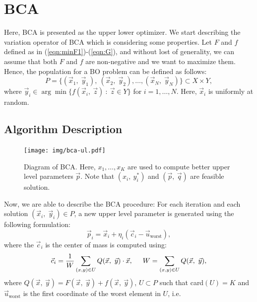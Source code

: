 \documentclass[conference]{IEEEtran}
\begin{document}
\section{BCA} %
\label{sec:bca}

Here, BCA is presented as the upper lower optimizer. We start describing the
variation operator of BCA which is considering some properties. Let $F$ and $f$
defined as in (\ref{eqn:minF1})-(\ref{eqn:G}), and without lost of generality, we
can assume that both $F$ and $f$ are non-negative and we want to maximize them.
Hence, the population for a BO problem can be defined as follows: 
$$
    P = \{ (\vec{x}_1,\; \vec{y}_1), \ (\vec{x}_2,\; \vec{y}_2), \ldots,
           (\vec{x}_N,\; \vec{y}_N)
         \}
         \subset X \times Y,
$$
where $\vec{y}_i \in \arg \min \{ f(\vec{x}_i, \ \vec{z}) \ : \ \vec{z} \in Y \}$
for $i = 1,\ldots,N$. Here, $\vec{x}_i$ is uniformly at random.
% 

\subsection{Algorithm Description} %
\label{sub:algorithm_description}

\begin{figure}[!ht]
    \centering
    \texttt{[image: img/bca-ul.pdf]}
    \caption{Diagram of BCA. Here, $x_1,\ldots,x_K$ are used to compute better
    upper level parameters $\vec{p}$. Note that $(x_i,\ y_i^*)$ and
    $(\vec{p},\ \vec{q})$ are feasible solution.}
    \label{fig:bca-diag}
\end{figure}

Now, we are able to describe the BCA procedure: For each iteration and each
solution $(\vec{x}_i,\; \vec{y}_i) \in P$, a new upper level parameter is generated
using the following formulation:
% 
\begin{equation}
    \vec{p}_i =  \vec{x}_i + \eta _{i} ( \vec{c}_i - \vec{u}_{ \text{worst} } ),
    \label{eqn:vcu2F}
\end{equation}
% 
%
where the $\vec{c}_i$ is the center of mass is computed using:
%
\begin{equation}
    \vec{c}_i = \dfrac{1} {W} \sum_{(x,y) \in U} Q(\vec{x},\ \vec{y}) \cdot \vec{x} , 
            \hspace{0.5cm} 
            W = \sum_{ (x,y) \in U} Q(\vec{x},\ \vec{y}),
    \label{eqn:centerF}
\end{equation} 
% 
where $Q(\vec{x},\ \vec{y}) = F(\vec{x},\ \vec{y}) + f(\vec{x},\ \vec{y})$, $U \subset P $
such that card$(U) = K$  and $\vec{u}_{ \text{worst}}$ is the first coordinate of
the worst element in $U$, i.e.
\end{document}

